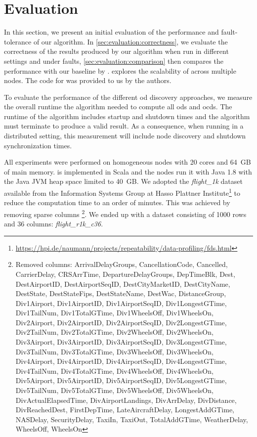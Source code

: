 
\section{Evaluation}\label{sec:evaluation}

  In this section, we present an initial evaluation of the performance and fault-tolerance of our algorithm.
  In \cref{sec:evaluation:correctness}, we evaluate the correctness of the results produced by our algorithm when run in different settings and under faults, \cref{sec:evaluation:comparison} then compares the performance with our baseline \ocddiscover{} by \citeauthor{consonni}.
   explores the scalability of \dodo{} across multiple nodes.
  The code for \ocddiscover{} was provided to us by the authors.

  To evaluate the performance of the different \gls{od} discovery approaches, we measure the overall runtime the algorithm needed to compute all \glspl{od} and \glspl{ocd}.
  The runtime of the algorithm includes startup and shutdown times and the algorithm must terminate to produce a valid result.
  As a consequence, when running \dodo{} in a distributed setting, this measurement will include node discovery and shutdown synchronization times.

  All experiments were performed on homogeneous nodes with 20 cores and 64~GB of main memory.
  \dodo{} is implemented in Scala and the nodes run it with Java 1.8 with the Java JVM heap space limited to 40~GB.
  We adopted the \textit{flight\_1k} dataset available from the Information Systems Group at Hasso Plattner Institute\footnote{\url{https://hpi.de/naumann/projects/repeatability/data-profiling/fds.html}} to reduce the computation time to an order of minutes.
  This was achieved by removing sparse columns%
  \footnote{Removed columns: ArrivalDelayGroups, CancellationCode, Cancelled, CarrierDelay, CRSArrTime, DepartureDelayGroups, DepTimeBlk, Dest, DestAirportID, DestAirportSeqID, DestCityMarketID, DestCityName, DestState, DestStateFips, DestStateName, DestWac, DistanceGroup, Div1Airport, Div1AirportID, Div1AirportSeqID, Div1LongestGTime, Div1TailNum, Div1TotalGTime, Div1WheelsOff, Div1WheelsOn, Div2Airport, Div2AirportID, Div2AirportSeqID, Div2LongestGTime, Div2TailNum, Div2TotalGTime, Div2WheelsOff, Div2WheelsOn, Div3Airport, Div3AirportID, Div3AirportSeqID, Div3LongestGTime, Div3TailNum, Div3TotalGTime, Div3WheelsOff, Div3WheelsOn, Div4Airport, Div4AirportID, Div4AirportSeqID, Div4LongestGTime, Div4TailNum, Div4TotalGTime, Div4WheelsOff, Div4WheelsOn, Div5Airport, Div5AirportID, Div5AirportSeqID, Div5LongestGTime, Div5TailNum, Div5TotalGTime, Div5WheelsOff, Div5WheelsOn, DivActualElapsedTime, DivAirportLandings, DivArrDelay, DivDistance, DivReachedDest, FirstDepTime, LateAircraftDelay, LongestAddGTime, NASDelay, SecurityDelay, TaxiIn, TaxiOut, TotalAddGTime, WeatherDelay, WheelsOff, WheelsOn}.
  We ended up with a dataset consisting of 1000 rows and 36 columns: \textit{flight\_r1k\_c36}.

